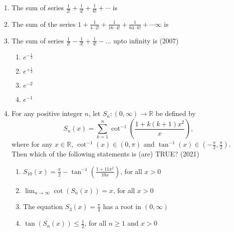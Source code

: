 \begin{enumerate}[label=\thesubsection.\arabic*,ref=\thesubsection.\theenumi]
\item {The sum of series $\frac{1}{2!}+\frac{1}{4!}+\frac{1}{6!}+\cdots$ is}
{\hfill{}} 
\begin{enumerate}
\end{enumerate}

\item {The sum of the series $1+\frac{1}{4\cdot2!}+\frac{1}{16\cdot4!}+\frac{1}{64\cdot6!}+\cdots  \infty$ is}
{\hfill{}} 
\begin{enumerate}
\end{enumerate}

    \item The sum of series $\frac{1}{2!}-\frac{1}{3!}+\frac{1}{4!}-\dots$ upto infinity is 
    \hfill(2007)

    \begin{enumerate}
    \item$e^{-\frac{1}{2}}$
    \item$e^{+\frac{1}{2}}$
    \item$e^{-2}$
    \item$e^{-1}$
    \end{enumerate}
    \item For any positive integer $n$, let $S_n: (0, \infty) \to \mathbb{R}$ be defined by  
    \[
    S_n(x) = \sum_{k=1}^n \cot^{-1}\left(\frac{1 + k(k+1)x^2}{x}\right),
    \]  
    where for any $x \in \mathbb{R}$, $\cot^{-1}(x) \in (0, \pi)$ and $\tan^{-1}(x) \in \left(-\frac{\pi}{2}, \frac{\pi}{2}\right)$. Then which of the following statements is (are) TRUE?  
    \hfill(2021)
    \begin{enumerate}
        \item  $S_{10}(x) = \frac{\pi}{2} - \tan^{-1}\left(\frac{1 + 11x^2}{10x}\right)$, for all $x > 0$  
        \item  $\lim_{n \to \infty} \cot(S_n(x)) = x$, for all $x > 0$  
        \item  The equation $S_3(x) = \frac{\pi}{4}$ has a root in $(0, \infty)$  
        \item  $\tan(S_n(x)) \leq \frac{1}{2}$, for all $n \geq 1$ and $x > 0$
    \end{enumerate}
\end{enumerate}
